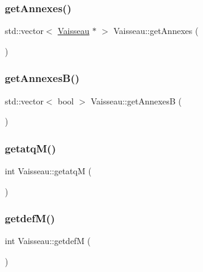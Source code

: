 \mbox{\label{class_vaisseau_ae09cad2739c02391139241343e361306}} 
\subsubsection{\texorpdfstring{get\+Annexes()}{getAnnexes()}}
{\footnotesize\ttfamily std\+::vector$<$ \hyperlink{class_vaisseau}{Vaisseau} $\ast$ $>$ Vaisseau\+::get\+Annexes (\begin{DoxyParamCaption}{ }\end{DoxyParamCaption})}

\mbox{\label{class_vaisseau_a60335bcf73c8095e63b353d91833f8a4}} 
\subsubsection{\texorpdfstring{get\+Annexes\+B()}{getAnnexesB()}}
{\footnotesize\ttfamily std\+::vector$<$ bool $>$ Vaisseau\+::get\+AnnexesB (\begin{DoxyParamCaption}{ }\end{DoxyParamCaption})}

\mbox{\label{class_vaisseau_a893c8a6199e3e79460891fafb0b16fba}} 
\subsubsection{\texorpdfstring{getatq\+M()}{getatqM()}}
{\footnotesize\ttfamily int Vaisseau\+::getatqM (\begin{DoxyParamCaption}{ }\end{DoxyParamCaption})}

\mbox{\label{class_vaisseau_aa983d5040f7c19a9dfcb907618fda321}} 
\subsubsection{\texorpdfstring{getdef\+M()}{getdefM()}}
{\footnotesize\ttfamily int Vaisseau\+::getdefM (\begin{DoxyParamCaption}{ }\end{DoxyParamCaption})}

